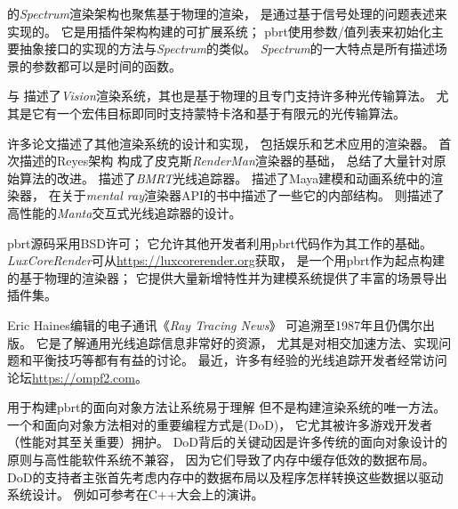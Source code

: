 \citet{glassner1993spectrum}的\emph{Spectrum}渲染架构也聚焦基于物理的渲染，
是通过基于信号处理的问题表述来实现的。
它是用插件架构构建的可扩展系统；
pbrt使用参数/值列表来初始化主要抽象接口的实现的方法与\emph{Spectrum}的类似。
\emph{Spectrum}的一大特点是所有描述场景的参数都可以是时间的函数。

\citet{468387,10.1007/978-3-7091-7484-5_6}与\citet{slusallek1996vision}
描述了\emph{Vision}渲染系统，其也是基于物理的且专门支持许多种光传输算法。
尤其是它有一个宏伟目标即同时支持蒙特卡洛和基于有限元的光传输算法。

许多论文描述了其他渲染系统的设计和实现，
包括娱乐和艺术应用的渲染器。
\citet{10.1145/37401.37414}首次描述的Reyes架构
构成了皮克斯\emph{RenderMan}渲染器的基础，
\citet{10.5555/555371}
总结了大量针对原始算法的改进。
\citet{doi:10.1080/10867651.1996.10487462}描述了\emph{BMRT}光线追踪器。
\citet{732097}描述了Maya建模和动画系统中的渲染器，
\citet{10.5555/863712}
在关于\emph{mental ray}渲染器API的书中描述了一些它的内部结构。
\citet{4061561}则描述了高性能的\emph{Manta}交互式光线追踪器的设计。

pbrt源码采用BSD许可；
它允许其他开发者利用pbrt代码作为其工作的基础。
\emph{LuxCoreRender}可从\url{https://luxcorerender.org}获取，
是一个用pbrt作为起点构建的基于物理的渲染器；
它提供大量新增特性并为建模系统提供了丰富的场景导出插件集。

Eric Haines编辑的电子通讯《\emph{Ray Tracing News}》
可追溯至1987年且仍偶尔出版。
它是了解通用光线追踪信息非常好的资源，
尤其是对相交加速方法、实现问题和平衡技巧等都有有益的讨论。
最近，许多有经验的光线追踪开发者经常访问论坛\url{https://ompf2.com}。

用于构建pbrt的面向对象方法让系统易于理解
但不是构建渲染系统的唯一方法。
一个和面向对象方法相对的重要编程方式是(DoD)，
它尤其被许多游戏开发者（性能对其至关重要）拥护。
DoD背后的关键动因是许多传统的面向对象设计的原则与高性能软件系统不兼容，
因为它们导致了内存中缓存低效的数据布局。
DoD的支持者主张首先考虑内存中的数据布局以及程序怎样转换这些数据以驱动系统设计。
例如可参考\citet{acton_2014}在C++大会上的演讲。